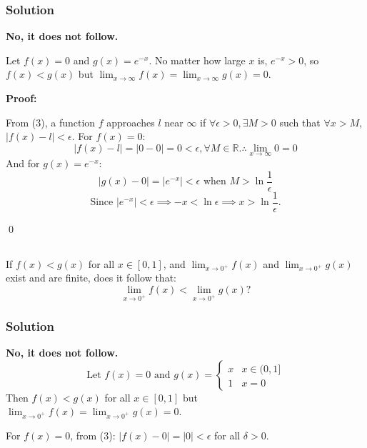 \documentclass{article}
\begin{document}
\subsubsection{Solution}
\textbf{No, it does not follow.}

Let $f(x)=0$ and $g(x)=e^{-x}$. No matter how large $x$ is,
$e^{-x} > 0$, so $f(x)<g(x)$ but $\lim_{x \to \infty}f(x)=\lim_{x \to \infty}g(x)=0$.

\textbf{Proof:}

From (3), a function $f$ approaches $l$ near $\infty$ if $\forall \epsilon > 0, \exists M > 0$ such that
$\forall x > M$, $|f(x)-l|< \epsilon$. For $f(x)=0$:
\begin{equation}
	|f(x)-l|=|0-0|=0<\epsilon, \forall M \in \mathbb{R}. \therefore \lim_{x \to \infty}0=0
\end{equation}
And for $g(x)=e^{-x}$:
\begin{equation}
	|g(x)-0|=|e^{-x}|<\epsilon \text{ when } M > \ln{\frac{1}{\epsilon}}
\end{equation}
\begin{equation*}
	\text{Since } |e^{-x}| < \epsilon \implies -x < \ln{\epsilon} \implies x > \ln{\frac{1}{\epsilon}}.
\end{equation*}

\qed

\subsection{}
If $f(x)<g(x)$ for all $x \in [0,1]$, and $\lim_{x \to 0^+}f(x)$ and $\lim_{x \to 0^+}g(x)$ exist
and are finite, does it follow that:
\begin{equation*}
	\lim_{x \to 0^+} f(x) < \lim_{x \to 0^+} g(x)\text{?}
\end{equation*}
\subsubsection{Solution}
\textbf{No, it does not follow.}
\begin{equation*}
	\text{Let } f(x)=0 \text{ and } g(x)=
	\begin{cases}
		x & x \in (0,1] \\
		1 & x=0
	\end{cases}
\end{equation*}
Then $f(x)<g(x)$ for all $x \in [0,1]$ but $\lim_{x \to 0^+}f(x)=\lim_{x \to 0^+}g(x)=0$.

For $f(x)=0$, from (3): $|f(x)-0|=|0|<\epsilon$ for all $\delta>0$.
\end{document}
